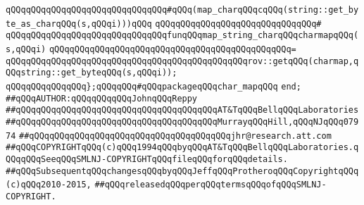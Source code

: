 \verb|qQQqqQQqqQQqqQQqqQQqqQQqqQQqqQQq#qQQq(map_charqQQqcqQQq(string::get_byte_as_charqQQq(s,qQQqi)))qQQq|\newline
\verb|qQQqqQQqqQQqqQQqqQQqqQQqqQQqqQQq#|\newline
\verb|qQQqqQQqqQQqqQQqqQQqqQQqqQQqqQQqfunqQQqmap_string_charqQQqcharmapqQQq(s,qQQqi)|\newline
\verb|qQQqqQQqqQQqqQQqqQQqqQQqqQQqqQQqqQQqqQQqqQQqqQQq=|\newline
\verb|qQQqqQQqqQQqqQQqqQQqqQQqqQQqqQQqqQQqqQQqqQQqqQQqrov::getqQQq(charmap,qQQqstring::get_byteqQQq(s,qQQqi));|\newline
\newline
\newline
\verb|qQQqqQQqqQQqqQQq};qQQqqQQq#qQQqpackageqQQqchar_mapqQQq|\newline
\verb|end;|\newline
\newline
\newline
\verb|##qQQqAUTHOR:qQQqqQQqqQQqJohnqQQqReppy|\newline
\verb|##qQQqqQQqqQQqqQQqqQQqqQQqqQQqqQQqqQQqqQQqAT&TqQQqBellqQQqLaboratories|\newline
\verb|##qQQqqQQqqQQqqQQqqQQqqQQqqQQqqQQqqQQqqQQqMurrayqQQqHill,qQQqNJqQQq07974|\newline
\verb|##qQQqqQQqqQQqqQQqqQQqqQQqqQQqqQQqqQQqqQQqjhr@research.att.com|\newline
\verb|##qQQqCOPYRIGHTqQQq(c)qQQq1994qQQqbyqQQqAT&TqQQqBellqQQqLaboratories.qQQqqQQqSeeqQQqSMLNJ-COPYRIGHTqQQqfileqQQqforqQQqdetails.|\newline
\verb|##qQQqSubsequentqQQqchangesqQQqbyqQQqJeffqQQqProtheroqQQqCopyrightqQQq(c)qQQq2010-2015,|\newline
\verb|##qQQqreleasedqQQqperqQQqtermsqQQqofqQQqSMLNJ-COPYRIGHT.|\newline

